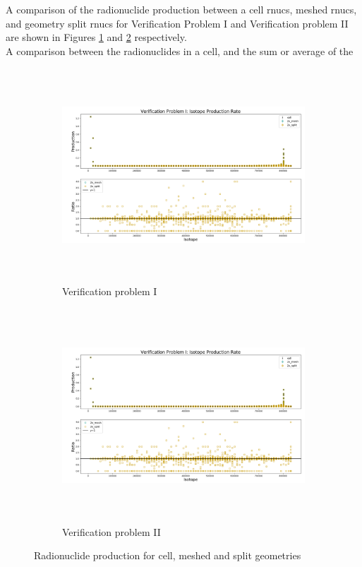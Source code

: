 A comparison of the radionuclide production between a cell rnucs,
meshed rnucs, and geometry split rnucs  for Verification Problem
I and Verification problem II are shown in Figures
\ref{1prod_cell_2x} and \ref{2prod_cell_2x} respectively.\\
A comparison between the radionuclides in a cell, and the sum or average of the 
\begin{figure}[h!]
 \begin{centering}
 \centering
 \begin{subfigure}[b]{.8\textwidth}
 \includegraphics[width=0.99\linewidth,height=8cm]{../figs/toy_p1/prod_VPI_2x.png}
 \caption{Verification problem I }
 \label{1prod_cell_2x}
 \end{subfigure}
 \hspace{0.05cm}
 \begin{subfigure}[b]{.8\textwidth}
 \centering
 \includegraphics[width=.99\linewidth,height=8cm]{../figs/toy_p1/prod_VPI_2x.png}
 \caption{Verification problem II}
 \label{2prod_cell_2x}
 \end{subfigure}
 \caption{Radionuclide production for cell, meshed and split geometries}
 \label{prod_cell_2x}
 \end{centering}
\end{figure}
